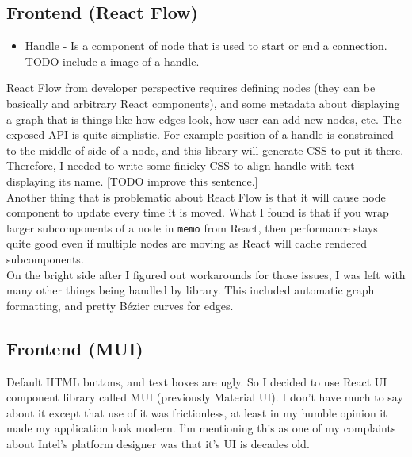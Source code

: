 \documentclass[12pt]{report}
\begin{document}
\subsection{Frontend (React Flow)}
\begin{tcolorbox}[title=Vocabulary]
    \begin{itemize}
        \item Handle - Is a component of node that is used to start or end a connection. TODO include a image of a handle.
    \end{itemize}
\end{tcolorbox}
React Flow from developer perspective requires defining nodes (they can be basically and arbitrary React components), and some metadata about displaying a graph that is things like how edges look, how user can add new nodes, etc. 
The exposed API is quite simplistic. 
For example position of a handle is constrained to the middle of side of a node, and this library will generate CSS to put it there. 
Therefore, I needed to write some finicky CSS to align handle with text displaying its name. [TODO improve this sentence.]
\\
Another thing that is problematic about React Flow is that it will cause node component to update every time it is moved. 
What I found is that if you wrap larger subcomponents of a node in \verb!memo! from React, then performance stays quite good even if multiple nodes are moving as React will cache rendered subcomponents.  
\\
On the bright side after I figured out workarounds for those issues, I was left with many other things being handled by library. This included automatic graph formatting, and pretty Bézier curves for edges. 

\subsection{Frontend (MUI)}
Default HTML buttons, and text boxes are ugly. So I decided to use React UI component library called MUI (previously Material UI). I don't have much to say about it except that use of it was frictionless, at least in my humble opinion it made my application look modern. I'm mentioning this as one of my complaints about Intel's platform designer was that it's UI is decades old.
\end{document}
